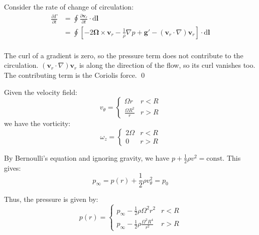 \documentclass[12pt]{article}
\begin{document}
Consider the rate of change of circulation:
\begin{equation}
    \begin{split}
        \frac{\partial \Gamma}{\partial t} &= \oint \frac{\partial \mathbf{v}_{r}}{\partial t} \cdot \mathrm{d}\mathbf{l} \\
        &= \oint \left[ -2\mathbf{\Omega} \times \mathbf{v}_{r} - \frac{1}{\rho} \nabla p + \mathbf{g}' - (\mathbf{v}_{r} \cdot \nabla) \mathbf{v}_{r} \right] \cdot \mathrm{d}\mathbf{l} \\
    \end{split}
\end{equation}

The curl of a gradient is zero, so the pressure term does not contribute to the circulation. $(\mathbf{v}_{r} \cdot \nabla) \mathbf{v}_{r}$ is along the direction of the flow, so its curl vanishes too. The contributing term is the Coriolis force.
\qed



Given the velocity field:
\begin{equation}
    v_{\theta} =
    \begin{cases}
        \Omega r               & r < R \\
        \frac{\Omega R^{2}}{r} & r > R
    \end{cases}
\end{equation}
we have the vorticity:
\begin{equation}
    \omega_{z} =
    \begin{cases}
        2\Omega & r < R \\
        0       & r > R
    \end{cases}
\end{equation}

By Bernoulli's equation and ignoring gravity, we have $p + \frac{1}{2} \rho v^{2} = \text{const}$. This gives:
\begin{equation}
    p_{\infty} = p(r) + \frac{1}{2} \rho v_{\theta}^{2} = p_{0}
\end{equation}

Thus, the pressure is given by:
\begin{equation}
    p(r) =
    \begin{cases}
        p_{\infty} - \frac{1}{2} \rho \Omega^{2} r^{2}               & r < R \\
        p_{\infty} - \frac{1}{2} \rho \frac{\Omega^{2} R^{4}}{r^{2}} & r > R
    \end{cases}
\end{equation}

\end{document}
